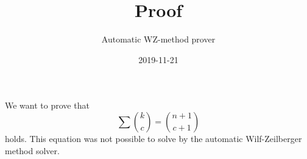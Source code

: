 \documentclass{article}
\title{Proof}
\author{Automatic WZ-method prover}
\date{2019-11-21}
\begin{document}
\maketitle
We want to prove that
\begin{equation}\label{Eq: 1}
\sum \binom{k}{c} = \binom{n+1}{c+1}
\end{equation}
holds. This equation was not possible to solve by the automatic Wilf-Zeilberger method solver.
\end{document}
